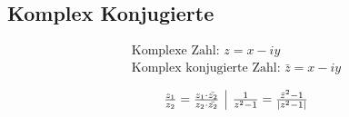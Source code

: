 \subsection{Komplex Konjugierte}
    \begin{align*}
        \text{Komplexe Zahl: } z = x - iy\\
        \text{Komplex konjugierte Zahl: } \bar{z} = x -iy\\
    \end{align*}
    \vspace{-2em}
    \[\begin{array}{c | c}
        \frac{z_1}{z_2} = \frac{z_1 \cdot \bar{z_2}}{z_2 \cdot \bar{z_2}} & \frac{1}{z^2 - 1} = \frac{\bar{z}^2 -1}{|z^2 - 1|}
    \end{array}\]